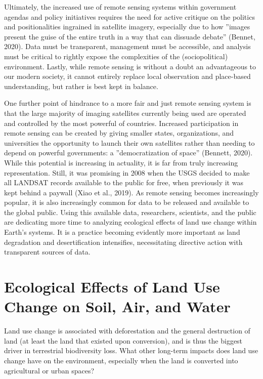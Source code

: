 \documentclass{book}\usepackage{knitr}
\begin{document}
Ultimately, the increased use of remote sensing systems within government agendas and policy initiatives requires the need for active critique on the politics and positionalities ingrained in satellite imagery, especially due to how ''images present the guise of the entire truth in a way that can dissuade debate'' (Bennet, 2020). Data must be transparent, management must be accessible, and analysis must be critical to rightly expose the complexities of the (sociopolitical) environment. Lastly, while remote sensing is without a doubt an advantageous to our modern society, it cannot entirely replace local observation and place-based understanding, but rather is best kept in balance.

One further point of hindrance to a more fair and just remote sensing system is that the large majority of imaging satellites currently being used are operated and controlled by the most powerful of countries. Increased participation in remote sensing can be created by giving smaller states, organizations, and universities the opportunity to launch their own satellites rather than needing to depend on powerful governments: a ''democratization of space'' (Bennett, 2020). While this potential is increasing in actuality, it is far from truly increasing representation. Still, it was promising in 2008 when the USGS decided to make all LANDSAT records available to the public for free, when previously it was kept behind a paywall (Xiao et al., 2019). As remote sensing becomes increasingly popular, it is also increasingly common for data to be released and available to the global public. Using this available data, researchers, scientists, and the public are dedicating more time to analyzing ecological effects of land use change within Earth's systems. It is a practice becoming evidently more important as land degradation and desertification intensifies, necessitating directive action with transparent sources of data.

\section{Ecological Effects of Land Use Change on Soil, Air, and Water}

Land use change is associated with deforestation and the general destruction of land (at least the land that existed upon conversion), and is thus the biggest driver in terrestrial biodiversity loss. What other long-term impacts does land use change have on the environment, especially when the land is converted into agricultural or urban spaces?
\end{document}
